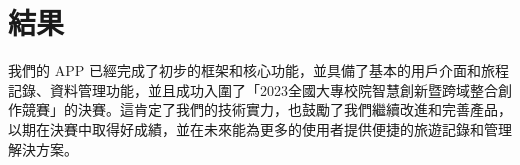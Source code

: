 \section{結果}

我們的 APP 已經完成了初步的框架和核心功能，並具備了基本的用戶介面和旅程記錄、資料管理功能，並且成功入圍了「2023全國大專校院智慧創新暨跨域整合創作競賽」的決賽。這肯定了我們的技術實力，也鼓勵了我們繼續改進和完善產品，以期在決賽中取得好成績，並在未來能為更多的使用者提供便捷的旅遊記錄和管理解決方案。